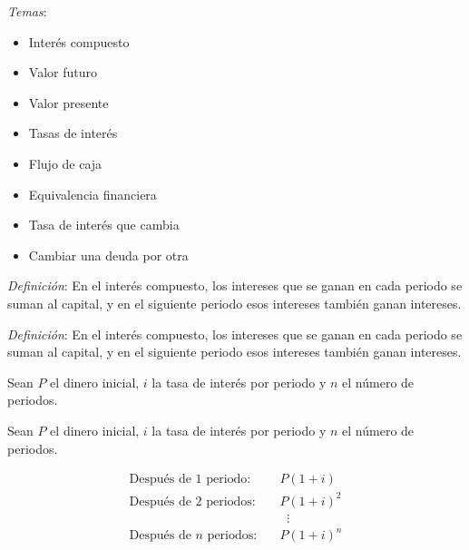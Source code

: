 \documentclass{beamer}
\begin{document}
  \begin{frame}
    \textit{Temas}:

    \begin{itemize}
      \item Interés compuesto
      \item Valor futuro
      \item Valor presente
      \item Tasas de interés
      \item Flujo de caja
      \item Equivalencia financiera
      \item Tasa de interés que cambia
      \item Cambiar una deuda por otra
    \end{itemize}
  \end{frame}

  \begin{frame}
    \textit{Definición}: En el interés compuesto, los intereses que se ganan en
    cada periodo se suman al capital, y en el siguiente periodo esos intereses
    también ganan intereses.
  \end{frame}

  \begin{frame}
    \textit{Definición}: En el interés compuesto, los intereses que se ganan en
    cada periodo se suman al capital, y en el siguiente periodo esos intereses
    también ganan intereses.
    \newline\newline

    Sean $P$ el dinero inicial, $i$ la tasa de interés por periodo y $n$ el
    número de periodos.
  \end{frame}

  \begin{frame}
    Sean $P$ el dinero inicial, $i$ la tasa de interés por periodo y $n$ el
    número de periodos.

    \begin{equation*}
      \begin{aligned}
        \text{Después de 1 periodo:} \quad & P(1+i) \\
        \text{Después de 2 periodos:} \quad & P(1+i)^2 \\
        &\;\;\vdots \\
        \text{Después de } n \text{ periodos:} \quad & P(1+i)^n
      \end{aligned}
    \end{equation*}
  \end{frame}
\end{document}
